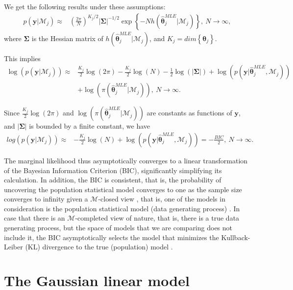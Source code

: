 We get the following results under these assumptions:
\begin{align*}
	p(\bm{y} | \mathcal{M}_j)\approx&\left( \frac{2\pi}{N}\right)^{K_j/2}|\bm{\Sigma}|^{-1/2} \exp\left\{-N h(\bm{\hat{\theta}}_j^{MLE}|\mathcal{M}_j)\right\}, \ N\rightarrow\infty,
\end{align*}
where $\bm{\Sigma}$ is the Hessian matrix of $h(\bm{\hat{\theta}}_j^{MLE}|\mathcal{M}_j)$, and $K_j=dim\left\{\bm{\theta}_j\right\}$.

This implies
\begin{align*}
	\log\left(p(\bm{y} | \mathcal{M}_j)\right)\approx& \frac{K_j}{2}\log(2\pi)- \frac{K_j}{2}\log(N) -\frac{1}{2}\log(|\bm{\Sigma}|) + \log(p(\bm{y}| \bm{\hat{\theta}}_j^{MLE},\mathcal{M}_j))\\
	&+\log(\pi(\bm{\hat{\theta}}_j^{MLE} | \mathcal{M}_j)), \ N\rightarrow\infty.
\end{align*}

Since $\frac{K_j}{2}\log(2\pi)$ and $\log(\pi(\bm{\hat{\theta}}_j^{MLE} | \mathcal{M}_j))$ are constants as functions of $\bm{y}$, and $|\bm{\Sigma}|$ is bounded by a finite constant, we have
\begin{align*}
	log\left(p(\bm{y} | \mathcal{M}_j)\right)\approx& -\frac{K_j}{2}\log(N)+\log(p(\bm{y}| \bm{\hat{\theta}}_j^{MLE},\mathcal{M}_j))= -\frac{BIC}{2}, \ N \rightarrow \infty.
\end{align*}

The marginal likelihood thus asymptotically converges to a linear transformation of the Bayesian Information Criterion (BIC), significantly simplifying its calculation. In addition, the BIC is consistent, that is, the probability of uncovering the population statistical model converges to one as the sample size converges to infinity given a $\mathcal{M}$-closed view \cite[Chap.~6]{Bernardo1994}, that is, one of the models in consideration is the population statistical model (data generating process) \cite{schwarz1978estimating, burnham2004multimodel}. In case that there is an $\mathcal{M}$-completed view of nature, that is, there is a true data generating process, but the space of models that we are comparing does not include it, the BIC asymptotically selects the model that minimizes the Kullback-Leiber (KL) divergence to the true (population) model \cite[Chap. ~4]{claeskens2008model}. 


\section{The Gaussian linear model}\label{sec10_2}

